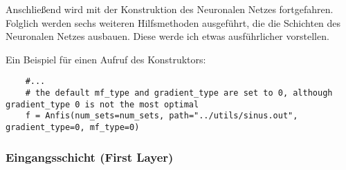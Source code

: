 Anschließend wird mit der Konstruktion des Neuronalen Netzes
fortgefahren. Folglich werden sechs weiteren Hilfsmethoden ausgeführt,
die die Schichten des Neuronalen Netzes ausbauen. Diese werde ich etwas
ausführlicher vorstellen.

Ein Beispiel für einen Aufruf des Konstruktors:


\begin{lstlisting}
	#...
	# the default mf_type and gradient_type are set to 0, although gradient_type 0 is not the most optimal
	f = Anfis(num_sets=num_sets, path="../utils/sinus.out", gradient_type=0, mf_type=0)
\end{lstlisting}


\subsubsection{Eingangsschicht (First
Layer)}\label{eingangsschicht-first-layer}


